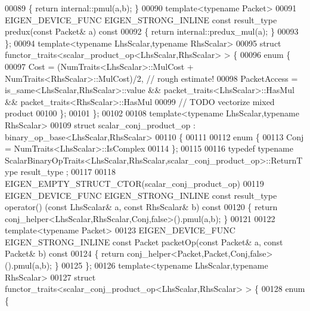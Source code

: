 \begin{DoxyCode}
00089 \textcolor{keyword}{  }\{ \textcolor{keywordflow}{return} internal::pmul(a,b); \}
00090   \textcolor{keyword}{template}<\textcolor{keyword}{typename} Packet>
00091   EIGEN\_DEVICE\_FUNC EIGEN\_STRONG\_INLINE \textcolor{keyword}{const} result\_type predux(\textcolor{keyword}{const} Packet& a)\textcolor{keyword}{ const}
00092 \textcolor{keyword}{  }\{ \textcolor{keywordflow}{return} internal::predux\_mul(a); \}
00093 \};
00094 \textcolor{keyword}{template}<\textcolor{keyword}{typename} LhsScalar,\textcolor{keyword}{typename} RhsScalar>
00095 \textcolor{keyword}{struct }functor\_traits<scalar\_product\_op<LhsScalar,RhsScalar> > \{
00096   \textcolor{keyword}{enum} \{
00097     Cost = (NumTraits<LhsScalar>::MulCost + NumTraits<RhsScalar>::MulCost)/2, \textcolor{comment}{// rough estimate!}
00098     PacketAccess = is\_same<LhsScalar,RhsScalar>::value && packet\_traits<LhsScalar>::HasMul && 
      packet\_traits<RhsScalar>::HasMul
00099     \textcolor{comment}{// TODO vectorize mixed product}
00100   \};
00101 \};
00102 
00108 \textcolor{keyword}{template}<\textcolor{keyword}{typename} LhsScalar,\textcolor{keyword}{typename} RhsScalar>
00109 \textcolor{keyword}{struct }scalar\_conj\_product\_op  : binary\_op\_base<LhsScalar,RhsScalar>
00110 \{
00111 
00112   \textcolor{keyword}{enum} \{
00113     Conj = NumTraits<LhsScalar>::IsComplex
00114   \};
00115   
00116   \textcolor{keyword}{typedef} \textcolor{keyword}{typename} ScalarBinaryOpTraits<LhsScalar,RhsScalar,scalar\_conj\_product\_op>::ReturnType result\_type
      ;
00117   
00118   EIGEN\_EMPTY\_STRUCT\_CTOR(scalar\_conj\_product\_op)
00119   EIGEN\_DEVICE\_FUNC EIGEN\_STRONG\_INLINE \textcolor{keyword}{const} result\_type operator() (\textcolor{keyword}{const} LhsScalar& a, \textcolor{keyword}{const} RhsScalar& 
      b)\textcolor{keyword}{ const}
00120 \textcolor{keyword}{  }\{ \textcolor{keywordflow}{return} conj\_helper<LhsScalar,RhsScalar,Conj,false>().pmul(a,b); \}
00121   
00122   \textcolor{keyword}{template}<\textcolor{keyword}{typename} Packet>
00123   EIGEN\_DEVICE\_FUNC EIGEN\_STRONG\_INLINE \textcolor{keyword}{const} Packet packetOp(\textcolor{keyword}{const} Packet& a, \textcolor{keyword}{const} Packet& b)\textcolor{keyword}{ const}
00124 \textcolor{keyword}{  }\{ \textcolor{keywordflow}{return} conj\_helper<Packet,Packet,Conj,false>().pmul(a,b); \}
00125 \};
00126 \textcolor{keyword}{template}<\textcolor{keyword}{typename} LhsScalar,\textcolor{keyword}{typename} RhsScalar>
00127 \textcolor{keyword}{struct }functor\_traits<scalar\_conj\_product\_op<LhsScalar,RhsScalar> > \{
00128   \textcolor{keyword}{enum} \{

\end{DoxyCode}
